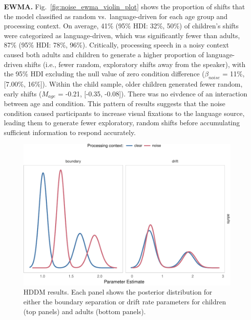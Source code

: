 \documentclass[english,man]{apa6}
\theoremstyle{definition}
\theoremstyle{definition}
\theoremstyle{definition}
\theoremstyle{remark}
\begin{document}
\textbf{EWMA.} Fig.~\ref{fig:noise_ewma_violin_plot} shows the
proportion of shifts that the model classified as random
vs.~language-driven for each age group and processing context. On
average, 41\% (95\% HDI: 32\%, 50\%) of children's shifts were
categorized as language-driven, which was significantly fewer than
adults, 87\% (95\% HDI: 78\%, 96\%). Critically, processing speech in a
noisy context caused both adults and children to generate a higher
proportion of language-driven shifts (i.e., fewer random, exploratory
shifts away from the speaker), with the 95\% HDI excluding the null
value of zero condition difference (\(\beta_{noise}\) = 11\%, {[}7.00\%,
16\%{]}). Within the child sample, older children generated fewer
random, early shifts (\(M_{age}\) = -0.21, {[}-0.35, -0.08{]}). There
was no eivdence of an interaction between age and condition. This
pattern of results suggests that the noise condition caused participants
to increase visual fixations to the language source, leading them to
generate fewer exploratory, random shifts before accumulating sufficient
information to respond accurately.

\begin{figure}[tb]

{\centering \includegraphics[width=0.8\linewidth]{figs/hddm-plot-noise-1} 

}

\caption{HDDM results. Each panel shows the posterior distribution for either the boundary separation or drift rate parameters for children (top panels) and adults (bottom panels).}\label{fig:hddm-plot-noise}
\end{figure}
\end{document}
